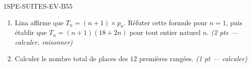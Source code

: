 \begin{evaluation}{1SPE-SUITES-EV-B}{55}
\begin{enumerate}
  \item Lina affirme que $T_n=(n+1)\times p_n$. Réfuter cette formule pour
  $n=1$, puis établir que $T_n=(n+1)(18+2n)$ pour tout entier naturel $n$.
  \ifnxVersionProfesseur\hfill\textit{(2 pts — calculer, raisonner)}\fi

  \item Calculer le nombre total de places des $12$ premières rangées.
  \ifnxVersionProfesseur\hfill\textit{(1 pt — calculer)}\fi
\end{enumerate}

\end{evaluation}
